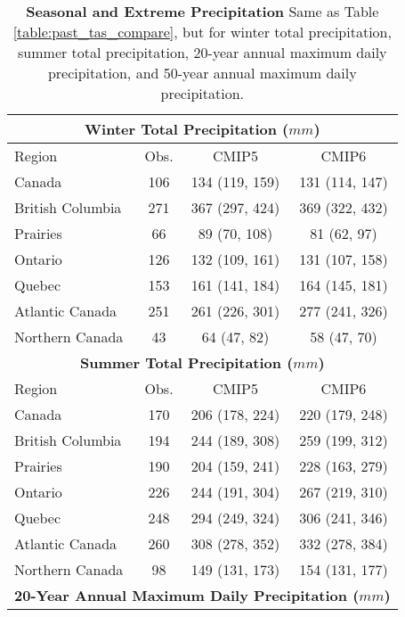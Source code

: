 \documentclass[]{scrartcl}
\begin{document}
\begin{table}[t]
	\caption{\textbf{Seasonal and Extreme Precipitation} Same as Table \ref{table:past_tas_compare}, but for winter total precipitation, summer total precipitation, 20-year annual maximum daily precipitation, and 50-year annual maximum daily precipitation. } \label{table:past_pr_compare}
	\begin{center}
		\begin{tabular}{|l|ccc|} 
			\hline
			\multicolumn{4}{|c|}{\textbf{Winter Total Precipitation ($mm$)}} \\
			\hline
			Region & Obs. & CMIP5 & CMIP6   \\
			\hline
			Canada & 106 & 134 (119, 159) & 131 (114, 147) \\ 
			British Columbia & 271 & 367 (297, 424) & 369 (322, 432) \\ 
			Prairies & 66 & 89 (70, 108) & 81 (62, 97) \\ 
			Ontario & 126 & 132 (109, 161) & 131 (107, 158) \\ 
			Quebec & 153 & 161 (141, 184) & 164 (145, 181) \\ 
			Atlantic Canada & 251 & 261 (226, 301) & 277 (241, 326) \\ 
			Northern Canada & 43 & 64 (47, 82) & 58 (47, 70) \\ 
			\hline	
			\multicolumn{4}{|c|}{\textbf{Summer Total Precipitation ($mm$)}} \\
			\hline
			Region & Obs. & CMIP5 & CMIP6   \\
			\hline
			Canada & 170 & 206 (178, 224) & 220 (179, 248) \\ 
			British Columbia & 194 & 244 (189, 308) & 259 (199, 312) \\ 
			Prairies & 190 & 204 (159, 241) & 228 (163, 279) \\ 
			Ontario & 226 & 244 (191, 304) & 267 (219, 310) \\ 
			Quebec & 248 & 294 (249, 324) & 306 (241, 346) \\ 
			Atlantic Canada & 260 & 308 (278, 352) & 332 (278, 384) \\ 
			Northern Canada & 98 & 149 (131, 173) & 154 (131, 177) \\ 				
			\hline
			\multicolumn{4}{|c|}{\textbf{20-Year Annual Maximum Daily Precipitation ($mm$)}} \\

\end{tabular}
\end{center}
\end{table}
\end{document}
